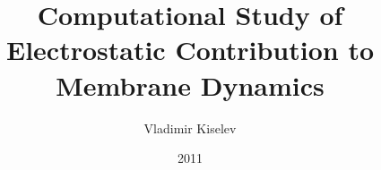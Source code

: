 \documentclass[12pt,openright]{report}
\begin{document}
\title{Computational Study of Electrostatic Contribution to Membrane Dynamics}
\author{Vladimir Kiselev}
\date{2011}
\maketitle
\declaration
{}
\dedication{This thesis is dedicated to my mum, my wife, and my children.}
\acknowledgements
\myabstract
\renewcommand{\contentsname}{Table of Contents}
\cleardoublepage
{}
\tableofcontents
\makenomenclature
\renewcommand{\nomname}{List of Abbreviations}

\cleardoublepage
{}
\listoffigures

\cleardoublepage
\printnomenclature[1in]

\cleardoublepage








\begin{appendices}



\end{appendices}

\begin{spacing}{1.0}


\end{spacing}
\end{document}
